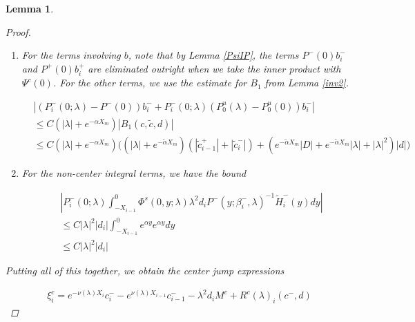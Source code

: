 \documentclass[12pt]{article}
\newtheorem{lemma}{Lemma}
\begin{document}
\begin{lemma}
\begin{proof}
\begin{enumerate}
Similarly, we have

\begin{align*}
|P_i^+(0; \lambda) &\Phi^u(0, X_i; \lambda) a_i^+| \\
&\leq C\Big( 
e^{-2 \alpha X_m} (|\lambda| + e^{-\tilde{\alpha}X_m})(|\tilde{c}_{i-1}^+| + |\tilde{c}_{i+1}^-|) + e^{-\alpha X_m} e^{-(\alpha - \rho)X_i}|c_i^-| \\
&+ (e^{-(\alpha + \tilde{\alpha}) X_m} |\lambda|^2 + e^{-2 \alpha X_m}|D| + e^{-\alpha X_m}|\lambda|) |d| \Big)
\end{align*}

\item For the terms involving $b$, note that by Lemma \ref{PsiIP}, the terms $P^-(0) b_i^-$ and $P^+(0)b_i^+$ are eliminated outright when we take the inner product with $\Psi^c(0)$. For the other terms, we use the estimate for $B_1$ from Lemma \ref{inv2}.

\begin{align*}
&|(P_i^-(0; \lambda) - P^-(0))b_i^- + P_i^-(0; \lambda)(P_0^u(\lambda) - P_0^u(0))b_i^-| \\
&\leq C(|\lambda| + e^{-\alpha X_m}) |B_1(c, \tilde{c}, d)| \\
&\leq C(|\lambda| + e^{-\alpha X_m}) \Big( 
(|\lambda| + e^{-\tilde{\alpha}X_m})( |\tilde{c}_{i-1}^+| + |\tilde{c}_i^-|)
+  ( e^{-\tilde{\alpha}X_m} |D| + e^{-\tilde{\alpha}X_m}|\lambda| + |\lambda|^2)|d| \Big)
\end{align*}

\item For the non-center integral terms, we have the bound

\begin{align*}
&\left| P_i^-(0; \lambda) 
\int_{-X_{i-1}}^0 \Phi^s(0, y; \lambda) \lambda^2 d_i P^-(y; \beta_i^-, \lambda)^{-1} \tilde{H}_i^-(y) dy \right| \\
&\leq C |\lambda|^2 |d_i| \int_{-X_{i-1}}^0 e^{\alpha y} e^{\alpha y} dy \\
&\leq C |\lambda|^2 |d_i|
\end{align*}

\end{enumerate}

Putting all of this together, we obtain the center jump expressions

\begin{align*}
\xi^c_i = e^{-\nu(\lambda) X_i} c_i^- - e^{\nu(\lambda) X_{i-1}} c_{i-1}^- - \lambda^2 d_i M^c + R^c(\lambda)_i(c^-, d)
\end{align*}


\end{proof}
\end{lemma}
\end{document}
